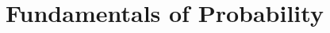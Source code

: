 \documentclass[british,11pt,a4paper]{report}
\begin{document}
\maketitle
\tableofcontents
\chapter{Fundamentals of Probability}

\end{document}
